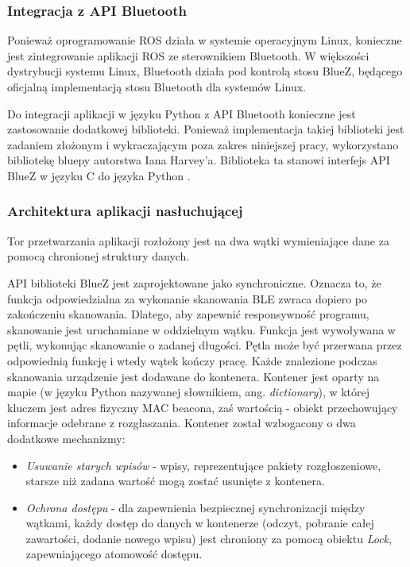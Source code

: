 \subsubsection{Integracja z API Bluetooth}
Ponieważ oprogramowanie ROS działa w systemie operacyjnym Linux, konieczne jest zintegrowanie aplikacji ROS ze sterownikiem Bluetooth.  W większości dystrybucji systemu Linux, Bluetooth działa pod kontrolą stosu BlueZ, będącego oficjalną implementacją stosu Bluetooth dla systemów Linux. 

Do integracji aplikacji w języku Python z API Bluetooth konieczne jest zastosowanie dodatkowej biblioteki. Ponieważ implementacja takiej biblioteki jest zadaniem złożonym i wykraczającym poza zakres niniejszej pracy, wykorzystano bibliotekę bluepy autorstwa Iana Harvey'a. Biblioteka ta stanowi interfejs API BlueZ w języku C do języka Python \cite{pybluez}.

\subsubsection{Architektura aplikacji nasłuchującej}
Tor przetwarzania aplikacji rozłożony jest na dwa wątki wymieniające dane za pomocą chronionej struktury danych. 

API biblioteki BlueZ jest zaprojektowane jako synchroniczne. Oznacza to, że funkcja odpowiedzialna za wykonanie skanowania BLE zwraca dopiero po zakończeniu skanowania. Dlatego, aby zapewnić responsywność programu, skanowanie jest uruchamiane w oddzielnym wątku. Funkcja jest wywoływana w pętli, wykonując skanowanie o zadanej długości. Pętla może być przerwana przez odpowiednią funkcję i wtedy wątek kończy pracę. 
Każde znalezione podczas skanowania urządzenie jest dodawane do kontenera. Kontener jest oparty na mapie (w języku Python nazywanej słownikiem, ang. \textit{dictionary}), w której kluczem jest adres fizyczny MAC beacona, zaś wartością - obiekt przechowujący informacje odebrane z rozgłaszania. Kontener został wzbogacony o dwa dodatkowe mechanizmy: 
\begin{itemize}
 \item \textit{Usuwanie starych wpisów} - wpisy, reprezentujące pakiety rozgłoszeniowe, starsze niż zadana wartość mogą zostać usunięte z kontenera.
 \item \textit{Ochrona dostępu} - dla zapewnienia bezpiecznej synchronizacji między wątkami, każdy dostęp do danych w kontenerze (odczyt, pobranie całej zawartości, dodanie nowego wpisu) jest chroniony za pomocą obiektu \textit{Lock}, zapewniającego atomowość dostępu.
\end{itemize}

